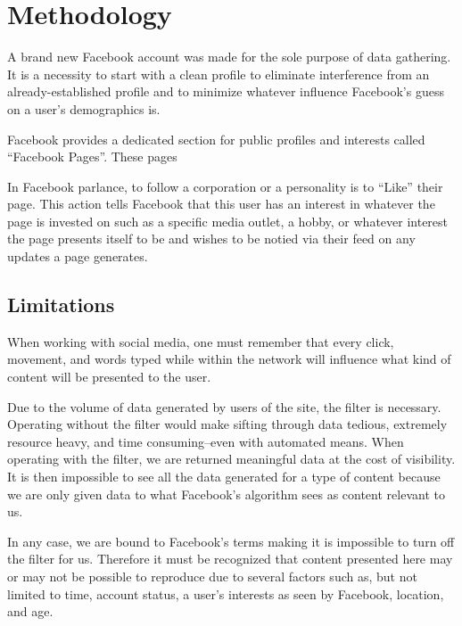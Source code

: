 \chapter{Methodology}\label{chap:methodology}

A brand new Facebook account was made for the sole purpose of data
gathering. It is a necessity to start with a clean profile to eliminate 
interference from an already-established profile and to minimize
whatever influence Facebook's guess on a user's demographics is.


Facebook provides a dedicated section for public profiles and interests
called ``Facebook Pages''. These pages 

In Facebook parlance, to follow a corporation or a personality is to
``Like'' their page. This action tells Facebook that this user has an
interest in whatever the page is invested on such as a specific media
outlet, a hobby, or whatever interest the page presents itself to be and
wishes to be notied via their feed on any updates a page generates.

\section{Limitations}\label{sec:limits}

When working with social media, one must remember that every click,
movement, and words typed while within the network will influence what
kind of content will be presented to the user.

Due to the volume of data generated by users of the site, the filter is
necessary. Operating without the filter would make sifting through data
tedious, extremely resource heavy, and time consuming--even with
automated means. When operating with the filter, we are returned
meaningful data at the cost of visibility. It is then impossible to see
all the data generated for a type of content because we are only given
data to what Facebook's algorithm sees as content relevant to us.

In any case, we are bound to Facebook's terms making it is impossible to
turn off the filter for us. Therefore it must be recognized that content
presented here may or may not be possible to reproduce due to several
factors such as, but not limited to time, account status, a user's
interests as seen by Facebook, location, and age.


